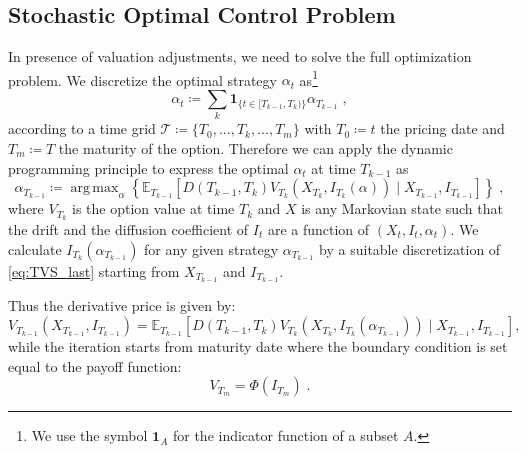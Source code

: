 \documentclass[11pt]{article}
\DeclareMathOperator*{\argmax}{arg\,max}
\begin{document}
\subsection{Stochastic Optimal Control Problem}
In presence of valuation adjustments, we need to solve the full optimization problem. We discretize the optimal strategy $\alpha_t$ as\footnote{We use the symbol $\mathbf{1}_A$ for the indicator function of a subset $A$.}
\begin{equation}
    \alpha_t \coloneqq \sum_k \mathbf{1}_{ \{t \in [T_{k-1}, T_k)\}}\alpha_{T_{k-1}} \; ,
\label{eq:piecewise_strategy}\end{equation}
according to a time grid $\mathcal{T}\coloneqq \{T_0,...,T_k,...,T_m\}$ with $T_0\coloneqq t$ the pricing date and $T_m \coloneqq T$ the maturity of the option. 
Therefore we can apply the dynamic programming principle to express the optimal $\alpha_t$ at time $T_{k-1}$ as
\begin{equation}
    \alpha_{T_{k-1}}\coloneqq \argmax_{\alpha} \left\{\mathbb{E}_{T_{k-1}}\left[D\left(T_{k-1},T_{k} \right) V_{T_{k}}\left(X_{T_{k}}, I_{T_{k}}(\alpha)\right) \mid X_{T_{k-1}}, I_{T_{k-1}}\right]\right\} \; ,
\label{eq:recursion}\end{equation}
where $V_{T_k}$ is the option value at time $T_k$ and $X$ is any Markovian state such that the drift and the diffusion coefficient of $I_t$ are a function of $\left(X_t,I_t,\alpha_t\right)$. We calculate $I_{T_k}\left(\alpha_{T_{k-1}}\right)$ for any given strategy $\alpha_{T_{k-1}}$ by a suitable discretization of \eqref{eq:TVS_last} starting from $X_{T_{k-1}}$ and $I_{T_{k-1}}$.

Thus the derivative price is given by:
\begin{equation}
    V_{T_{k-1}}\left(X_{T_{k-1}}, I_{T_{k-1}}\right)=\mathbb{E}_{T_{k-1}}\left[D\left(T_{k-1},T_{k}\right) V_{T_{k}}\left(X_{T_{k}}, I_{T_{k}}\left(\alpha_{T_{k-1}}\right)\right) \mid X_{T_{k-1}}, I_{T_{k-1}}\right],
\label{eq:recursion2}\end{equation}
while the iteration starts from maturity date where the boundary condition is set equal to the payoff function:
\begin{equation}
    V_{T_m} = \Phi\left(I_{T_m}\right) \; .
\end{equation}
\end{document}
